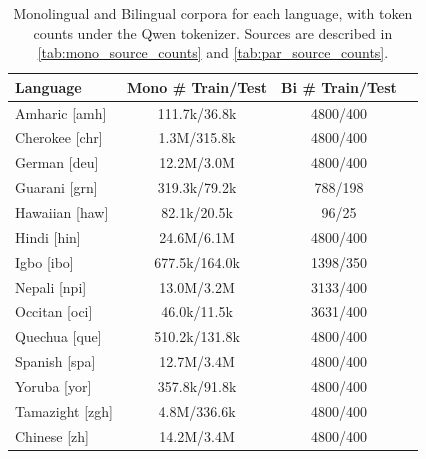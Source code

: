 \begin{table}[h!]
    \small
    \centering
        \begin{tabular}{l c c c}
            \toprule
            \textbf{Language} & \textbf{Mono \# Train/Test} & \textbf{Bi \# Train/Test} \\
            \midrule
            Amharic [amh] & 111.7k/36.8k & 4800/400 \\ 
            Cherokee [chr] & 1.3M/315.8k & 4800/400 \\ 
            German [deu] & 12.2M/3.0M & 4800/400 \\ 
            Guarani [grn] & 319.3k/79.2k & 788/198 \\ 
            Hawaiian [haw] & 82.1k/20.5k & 96/25 \\ 
            Hindi [hin] & 24.6M/6.1M & 4800/400 \\ 
            Igbo [ibo] & 677.5k/164.0k & 1398/350 \\ 
            Nepali [npi] & 13.0M/3.2M & 3133/400 \\ 
            Occitan [oci] & 46.0k/11.5k & 3631/400 \\ 
            Quechua [que] & 510.2k/131.8k & 4800/400 \\ 
            Spanish [spa] & 12.7M/3.4M & 4800/400 \\ 
            Yoruba [yor] & 357.8k/91.8k & 4800/400 \\ 
            Tamazight [zgh] & 4.8M/336.6k & 4800/400 \\ 
            Chinese [zh] & 14.2M/3.4M & 4800/400 \\ 
            \bottomrule
        \end{tabular}
    \caption{Monolingual and Bilingual corpora for each language, with token counts under the Qwen tokenizer. Sources are described in \autoref{tab:mono_source_counts} and \autoref{tab:par_source_counts}.}
    \label{tab:combined}
\end{table}